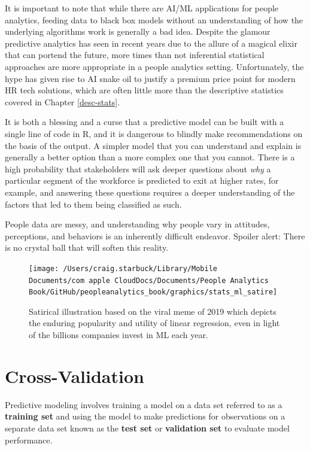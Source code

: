 \documentclass[
]{book}
\begin{document}
It is important to note that while there are AI/ML applications for people analytics, feeding data to black box models without an understanding of how the underlying algorithms work is generally a bad idea. Despite the glamour predictive analytics has seen in recent years due to the allure of a magical elixir that can portend the future, more times than not inferential statistical approaches are more appropriate in a people analytics setting. Unfortunately, the hype has given rise to AI snake oil to justify a premium price point for modern HR tech solutions, which are often little more than the descriptive statistics covered in Chapter \ref{desc-stats}.

It is both a blessing and a curse that a predictive model can be built with a single line of code in R, and it is dangerous to blindly make recommendations on the basis of the output. A simpler model that you can understand and explain is generally a better option than a more complex one that you cannot. There is a high probability that stakeholders will ask deeper questions about \emph{why} a particular segment of the workforce is predicted to exit at higher rates, for example, and answering these questions requires a deeper understanding of the factors that led to them being classified as such.

People data are messy, and understanding why people vary in attitudes, perceptions, and behaviors is an inherently difficult endeavor. Spoiler alert: There is no crystal ball that will soften this reality.

\begin{figure}

{\centering \texttt{[image: /Users/craig.starbuck/Library/Mobile Documents/com~apple~CloudDocs/Documents/People Analytics Book/GitHub/peopleanalytics\_book/graphics/stats\_ml\_satire]} 

}

\caption{Satirical illustration based on the viral meme of 2019 which depicts the enduring popularity and utility of linear regression, even in light of the billions companies invest in ML each year.}\label{fig:stats-ml-satire}
\end{figure}

\hypertarget{cross-validation}{%
\section{Cross-Validation}\label{cross-validation}}

Predictive modeling involves training a model on a data set referred to as a \textbf{training set} and using the model to make predictions for observations on a separate data set known as the \textbf{test set} or \textbf{validation set} to evaluate model performance.
\end{document}
